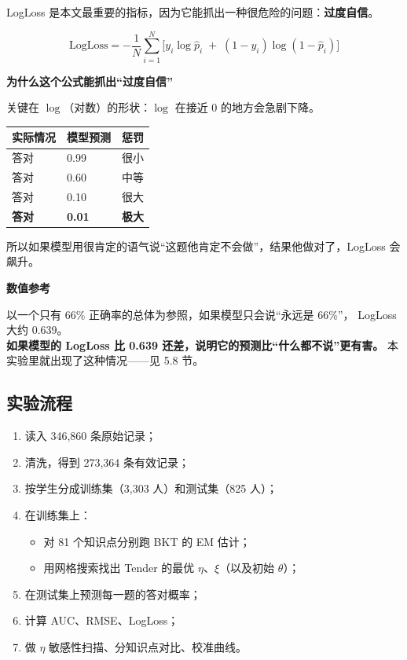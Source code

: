 \documentclass[UTF8,a4paper,11pt]{ctexart}
\newenvironment{explainbox}[1]
{\begin{center}\begin{minipage}{0.94\textwidth}\colorbox{boxbg}{\parbox{0.92\textwidth}{\textbf{#1}\par\vspace{2pt}}}}
{\end{minipage}\end{center}}
\newcommand{\hl}[1]{\textcolor{blue!70!black}{\textbf{#1}}}
\newcommand{\warn}[1]{\textcolor{red!70!black}{\textbf{#1}}}
\begin{document}
LogLoss 是本文最重要的指标，因为它能抓出一种很危险的问题：\hl{过度自信}。

\begin{equation}
\text{LogLoss} = -\frac{1}{N}\sum_{i=1}^{N}\Big[y_i \log \hat{p}_i \;+\; (1-y_i)\log(1-\hat{p}_i)\Big]
\label{p1:eq:logloss}
\end{equation}

\begin{explainbox}{为什么这个公式能抓出“过度自信”}
关键在 $\log$（对数）的形状：$\log$ 在接近 0 的地方会急剧下降。

\begin{center}
\begin{tabular}{p{3.4cm}p{3.4cm}p{6.6cm}}
\toprule
\textbf{实际情况} & \textbf{模型预测} & \textbf{惩罚} \\
\midrule
答对 & 0.99 & 很小 \\
答对 & 0.60 & 中等 \\
答对 & 0.10 & 很大 \\
\textbf{答对} & \textbf{0.01} & \warn{极大} \\
\bottomrule
\end{tabular}
\end{center}

所以如果模型用很肯定的语气说“这题他肯定不会做”，结果他做对了，LogLoss 会飙升。
\end{explainbox}

\begin{explainbox}{数值参考}
以一个只有 66\% 正确率的总体为参照，如果模型只会说“永远是 66\%”，
LogLoss 大约 0.639。\\
\textbf{如果模型的 LogLoss 比 0.639 还差，说明它的预测比“什么都不说”更有害。}
本实验里就出现了这种情况——见 5.8 节。
\end{explainbox}

\subsection{实验流程}

\begin{enumerate}[leftmargin=1.8em]
\item 读入 346,860 条原始记录；
\item 清洗，得到 273,364 条有效记录；
\item 按学生分成训练集（3,303 人）和测试集（825 人）；
\item 在训练集上：
  \begin{itemize}
  \item 对 81 个知识点分别跑 BKT 的 EM 估计；
  \item 用网格搜索找出 Tender 的最优 $\eta$、$\xi$（以及初始 $\theta$）；
  \end{itemize}
\item 在测试集上预测每一题的答对概率；
\item 计算 AUC、RMSE、LogLoss；
\item 做 $\eta$ 敏感性扫描、分知识点对比、校准曲线。
\end{enumerate}
\end{document}
